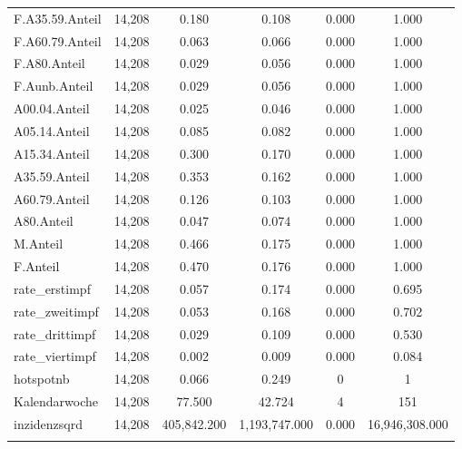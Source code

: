 \documentclass{article}
\begin{document}
\begin{table}[!htbp]
\begin{tabular}{@{\extracolsep{5pt}}lccccc}
F.A35.59.Anteil & 14,208 & 0.180 & 0.108 & 0.000 & 1.000 \\ 
F.A60.79.Anteil & 14,208 & 0.063 & 0.066 & 0.000 & 1.000 \\ 
F.A80.Anteil & 14,208 & 0.029 & 0.056 & 0.000 & 1.000 \\ 
F.Aunb.Anteil & 14,208 & 0.029 & 0.056 & 0.000 & 1.000 \\ 
A00.04.Anteil & 14,208 & 0.025 & 0.046 & 0.000 & 1.000 \\ 
A05.14.Anteil & 14,208 & 0.085 & 0.082 & 0.000 & 1.000 \\ 
A15.34.Anteil & 14,208 & 0.300 & 0.170 & 0.000 & 1.000 \\ 
A35.59.Anteil & 14,208 & 0.353 & 0.162 & 0.000 & 1.000 \\ 
A60.79.Anteil & 14,208 & 0.126 & 0.103 & 0.000 & 1.000 \\ 
A80.Anteil & 14,208 & 0.047 & 0.074 & 0.000 & 1.000 \\ 
M.Anteil & 14,208 & 0.466 & 0.175 & 0.000 & 1.000 \\ 
F.Anteil & 14,208 & 0.470 & 0.176 & 0.000 & 1.000 \\ 
rate\_erstimpf & 14,208 & 0.057 & 0.174 & 0.000 & 0.695 \\ 
rate\_zweitimpf & 14,208 & 0.053 & 0.168 & 0.000 & 0.702 \\ 
rate\_drittimpf & 14,208 & 0.029 & 0.109 & 0.000 & 0.530 \\ 
rate\_viertimpf & 14,208 & 0.002 & 0.009 & 0.000 & 0.084 \\ 
hotspotnb & 14,208 & 0.066 & 0.249 & 0 & 1 \\ 
Kalendarwoche & 14,208 & 77.500 & 42.724 & 4 & 151 \\ 
inzidenzsqrd & 14,208 & 405,842.200 & 1,193,747.000 & 0.000 & 16,946,308.000 \\ 
\hline \\[-1.8ex] 
\end{tabular} 
\end{table} 
\end{document}

